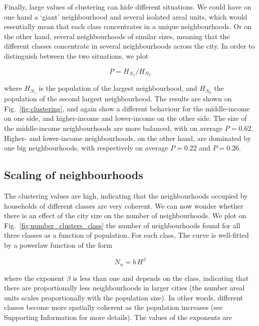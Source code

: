 Finally, large values of clustering can hide different situations. We
could have on one hand a `giant' neighbourhood and several isolated areal units, which
would essentially mean that each class concentrates in a unique
neighbourhoods. Or on the other hand, several neighbourhoods of
similar sizes, meaning that the different classes concentrate in
several neighbourhoods across the city. In order to distinguish
between the two situations, we plot

\begin{equation} 
    P = H_{N_1} / H_{N_2} 
\end{equation}

where $H_{N_1}$ is the population of the largest neighbourhood, and $H_{N_2}$
the population of the second largest neighbourhood. The results are shown on
Fig.~\ref{fig:clustering}, and again show a different behaviour for the
middle-income on one side, and higher-income and lower-income on the other side.
The size of the middle-income neighbourhoods are more balanced, with on average
$P=0.62$.  Higher- and lower-income neighbourhoods, on the other hand, are
dominated by one big neighbourhoods, with respectively on average $P=0.22$ and
$P=0.26$.


 \subsection{Scaling of neighbourhoods}
       \label{ssub:dependence_on_city_size}
       
The clustering values are high, indicating that the neighbourhoods occupied by
households of different classes are very coherent. We can now wonder whether
there is an effect of the city size on the number of neighbourhoods. We plot on
Fig.~\ref{fig:number_clusters_class} the number of neighbourhoods found for all
three classes as a function of population. For each class, The curve is
well-fitted by a powerlaw function of the form

\begin{equation}
    N_n = b\,H^\beta
\end{equation}

where the exponent $\beta$ is less than one and depends on the class, 
indicating that there are proportionally less neighbourhoods
in larger cities (the number areal units scales proportionally with the
population size). In other words, different classes become more spatially
coherent as the population increases (see Supporting Information for more
details). The values of the exponents are

